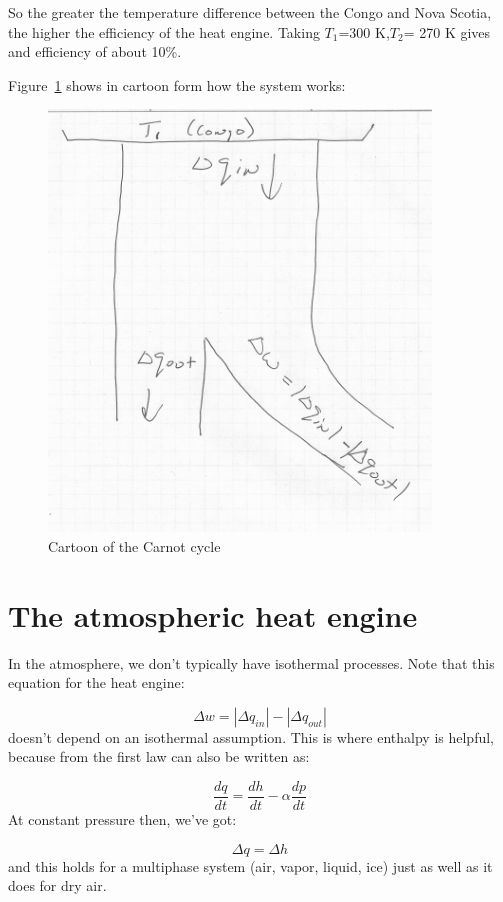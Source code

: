 \documentclass[12pt]{article}
\begin{document}
So the greater the temperature difference between the Congo and Nova Scotia, the higher the
efficiency of the heat engine.  Taking $T_1$=300 K,$T_2$= 270 K gives and efficiency of about 10\%.

Figure~\ref{fig:carnot2} shows in cartoon form how the system works:

\begin{figure}[htbp]
   \includegraphics[width=4in]{carnot2.png}  
  \caption{Cartoon of the Carnot cycle}
  \label{fig:carnot2}
\end{figure}

\section{The atmospheric heat engine}
\label{sec:atmosph-heat-engine}

In the atmosphere, we don't typically have isothermal processes.   Note that this equation for the heat engine:


  \begin{equation}
    \label{eq:cycle2}
    \Delta w = | \Delta q_{in} | - | \Delta q_{out} |
  \end{equation}
doesn't depend on an isothermal assumption.  This is where enthalpy is helpful, because from the first law can also be written as:

\begin{equation}
  \label{eq:firsth}
  \frac{dq}{dt} = \frac{dh}{dt} - \alpha \frac{dp}{dt}
\end{equation}
At constant pressure then, we've got:

\begin{equation}
  \label{eq:consp}
  \Delta q = \Delta h
\end{equation}
and this holds for a multiphase system (air, vapor, liquid, ice) just as well as it does for dry air.
\end{document}

